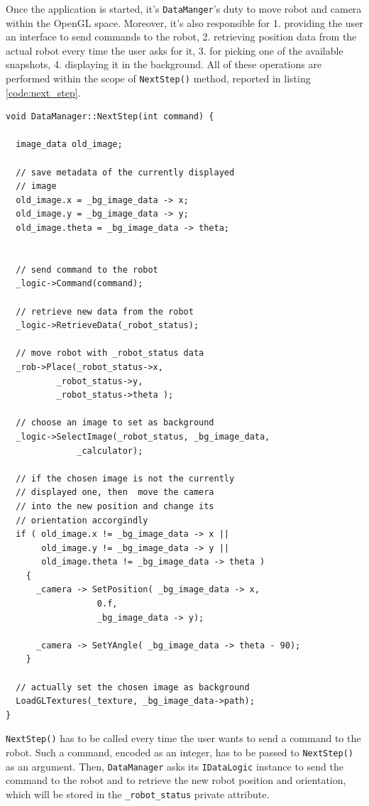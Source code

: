 %
Once the application is started, it's \texttt{DataManger}'s duty 
to move robot and camera within the OpenGL space. Moreover, 
it's also responsible for 1. providing the user an interface 
to send commands to the robot, 2. retrieving position 
data from the actual robot every time the user asks 
for it, 3. for picking one of the available snapshots, 
4. displaying it in the background. 
%
All of these operations are performed within the 
scope of \texttt{NextStep()} method, reported in 
listing \ref{code:next_step}.
%
\begin{lstlisting}[caption={The \texttt{DataManager::NextStep()} method}, label={code:next_step}, frame=trBL]
void DataManager::NextStep(int command) {

  image_data old_image;

  // save metadata of the currently displayed 
  // image
  old_image.x = _bg_image_data -> x;
  old_image.y = _bg_image_data -> y;
  old_image.theta = _bg_image_data -> theta;


  // send command to the robot
  _logic->Command(command);

  // retrieve new data from the robot
  _logic->RetrieveData(_robot_status);

  // move robot with _robot_status data
  _rob->Place(_robot_status->x,
	      _robot_status->y,
	      _robot_status->theta ); 

  // choose an image to set as background
  _logic->SelectImage(_robot_status, _bg_image_data,
		      _calculator);

  // if the chosen image is not the currently
  // displayed one, then  move the camera
  // into the new position and change its 
  // orientation accorgindly
  if ( old_image.x != _bg_image_data -> x ||
       old_image.y != _bg_image_data -> y ||
       old_image.theta != _bg_image_data -> theta )
    {
      _camera -> SetPosition( _bg_image_data -> x,
			      0.f,
			      _bg_image_data -> y);
      
      _camera -> SetYAngle( _bg_image_data -> theta - 90);
    }

  // actually set the chosen image as background
  LoadGLTextures(_texture, _bg_image_data->path);
}
\end{lstlisting}
%
\texttt{NextStep()} has to be called every time 
the user wants to send a command to the robot. 
%
Such a command, encoded as an integer, has to be passed to 
\texttt{NextStep()} as an argument.
%
Then, \texttt{DataManager} asks its \texttt{IDataLogic} 
instance to send the command to the robot and to 
retrieve the new robot position and orientation, which will be 
stored in the \texttt{\_robot\_status} private attribute.
%

